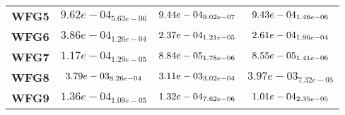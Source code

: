 \documentclass{article}
\begin{document}
\begin{table}[!htp]
\begin{scriptsize}
\begin{tabular}{c|ccc}
      \textbf{WFG5} & $9.62e-04_{5.63e-06} $ & $ \cellcolor{gray25} 9.44e-04_{9.02e-07} $ & $ \cellcolor{gray95} 9.43e-04_{1.46e-06}$ \\
      \textbf{WFG6} & $3.86e-04_{1.26e-04} $ & $ \cellcolor{gray95} 2.37e-04_{1.21e-05} $ & $ \cellcolor{gray25} 2.61e-04_{1.96e-04}$ \\
      \textbf{WFG7} & $1.17e-04_{1.29e-05} $ & $ \cellcolor{gray25} 8.84e-05_{1.78e-06} $ & $ \cellcolor{gray95} 8.55e-05_{1.41e-06}$ \\
      \textbf{WFG8} & $\cellcolor{gray25} 3.79e-03_{8.26e-04} $ & $ \cellcolor{gray95} 3.11e-03_{3.02e-04} $ & $ 3.97e-03_{7.32e-05}$ \\
      \textbf{WFG9} & $1.36e-04_{1.09e-05} $ & $ \cellcolor{gray25} 1.32e-04_{7.62e-06} $ & $ \cellcolor{gray95} 1.01e-04_{2.35e-05}$ \\
  \end{tabular}
  \end{scriptsize}
\end{table}
\end{document}
